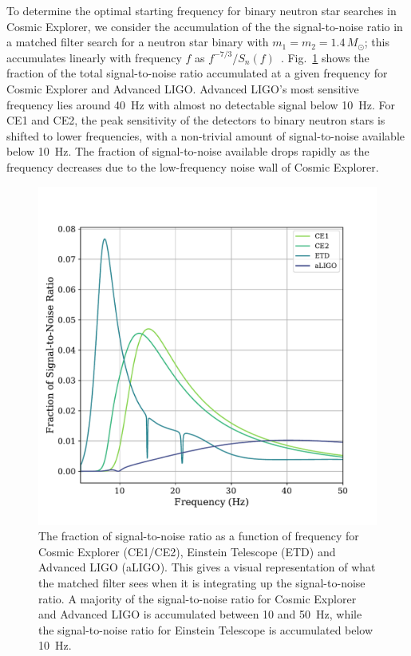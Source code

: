 To determine the optimal starting frequency for binary neutron star searches in Cosmic Explorer, we consider the accumulation of the the signal-to-noise ratio in a matched filter search for a neutron star binary with $m_1 = m_2 = 1.4\,M_\odot$; this accumulates linearly with frequency $f$ as $f^{-7/3} / S_n(f)$~\cite{Finn:2000hj,Allen:2005fk}. Fig.~\ref{Fig:comp-cost-SNRfrac} shows the fraction of the total signal-to-noise ratio accumulated at a given frequency for Cosmic Explorer and Advanced LIGO. Advanced LIGO's most sensitive frequency lies around 40~Hz with almost no detectable signal below 10~Hz. For CE1 and CE2, the peak sensitivity of the detectors to binary neutron stars is shifted to lower frequencies, with a non-trivial amount of signal-to-noise available below 10~Hz.
The fraction of signal-to-noise available drops rapidly as the frequency decreases due to the low-frequency noise wall of Cosmic Explorer.
\begin{figure}
    \includegraphics[width=1.1\columnwidth]{Figures/3G-bns-search-prospects/SNRfraction-compcost.pdf}
    \caption{The fraction of signal-to-noise ratio as a function of frequency for Cosmic Explorer (CE1/CE2), Einstein Telescope (ETD) and Advanced LIGO (aLIGO). This gives a visual representation of what the matched filter sees when it is integrating up the signal-to-noise ratio. A majority of the signal-to-noise ratio for Cosmic Explorer and Advanced LIGO is accumulated between 10 and 50~Hz, while the signal-to-noise ratio for Einstein Telescope is accumulated below 10~Hz.}
\label{Fig:comp-cost-SNRfrac}
\end{figure}

